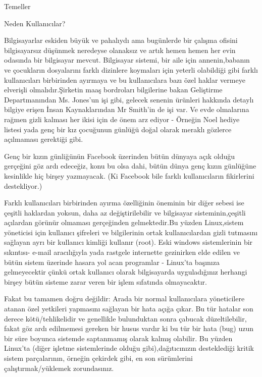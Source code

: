 \begin{section}{Temeller}
\begin{subsection}{Neden Kullanıcılar?}

Bilgisayarlar eskiden büyük ve pahalıydı ama bugünlerde bir çalışma ofisini bilgisayarsız düşünmek neredeyse olanaksız ve artık hemen hemen her evin odasında bir bilgisayar mevcut. Bilgisayar sistemi, bir aile için annenin,babanın ve çocukların dosyalarını farklı dizinlere koymaları için yeterli olabildiği gibi farklı kullanıcıları birbirinden ayırmaya ve bu kullanıcılara bazı özel haklar vermeye elverişli olmalıdır.Şirketin maaş bordroları bilgilerine bakan Geliştirme Departmanından Ms. Jones'un işi gibi, gelecek senenin ürünleri hakkında detaylı bilgiye erişen İnsan Kaynaklarından Mr Smith'in de işi var. Ve evde olmalarına rağmen gizli kalması her ikisi için de önem arz ediyor - Örneğin Noel hediye listesi yada genç bir kız çocuğunun günlüğü doğal olarak meraklı gözlerce açılmaması gerektiği gibi.

Genç bir kızın günliğünün Facebook üzerinden bütün dünyaya açık olduğu gerçeğini göz ardı edeceğiz, konu bu olsa dahi, bütün dünya genç kızın günlüğüne kesinlikle hiç birşey yazmayacak. (Ki Facebook bile farklı kullanıcıların fikirlerini destekliyor.)

Farklı kullanıcıları birbirinden ayırma özelliğinin öneminin bir diğer sebesi ise çeşitli haklardan yoksun, daha az değiştirilebilir ve bilgisayar sisteminin,çeşitli açılardan görünür olmaması gerçeğinden gelmektedir.Bu yüzden Linux,sistem yöneticisi için kullanıcı şifreleri ve bilgilerinin ortak kullanıcılardan gizli tutmasını sağlayan ayrı bir kullanıcı kimliği kullanır (root). Eski windows sistemlerinin bir sıkıntısı- e-mail aracılığıyla yada rastgele internette gezinirken elde edilen ve bütün sistem üzerinde hasara yol acan programlar - Linux'ta başınıza gelmeyecektir çünkü ortak kullanıcı olarak bilgisayarda uyguladığınız herhangi birşey bütün sisteme zarar veren bir işlem sıfatında olmayacaktır.

Fakat bu tamamen doğru değildir: Arada bir normal kullanıcılara yöneticilere atanan özel yetkileri yapmasını sağlayan bir hata açığa çıkar. Bu tür hatalar son derece kötü/tehlikelidir ve genellikle bulunduktan sonra çabucak düzeltilebilir, fakat göz ardı edilmemesi gereken bir husus vardır ki bu tür bir hata (bug) uzun bir süre boyunca sistemde saptanmamış olarak kalmış olabilir. Bu yüzden Linux’ta (diğer işletme sistemlerinde olduğu gibi),dağıtıcınızın desteklediği kritik sistem parçalarının, örneğin çekirdek gibi, en son sürümlerini çalıştırmak/yüklemek zorundasınız.


\end{subsection}
\end{section}
